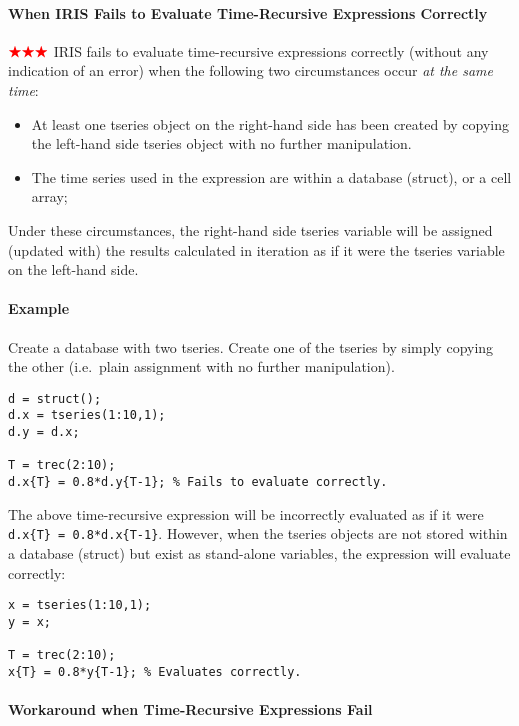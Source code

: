\paragraph{When IRIS Fails to Evaluate Time-Recursive Expressions
Correctly}

${\color{red}\bigstar\bigstar\bigstar}$ IRIS fails to evaluate time-recursive expressions correctly
(without any indication of an error) when the following two
circumstances occur \emph{at the same time}:

\begin{itemize}
\item
  At least one tseries object on the right-hand side has been created by
  copying the left-hand side tseries object with no further
  manipulation.
\item
  The time series used in the expression are within a database (struct),
  or a cell array;
\end{itemize}

Under these circumstances, the right-hand side tseries variable will be
assigned (updated with) the results calculated in iteration as if it
were the tseries variable on the left-hand side.

\paragraph{Example}

Create a database with two tseries. Create one of the tseries by simply
copying the other (i.e.~plain assignment with no further manipulation).

\begin{verbatim}
d = struct();
d.x = tseries(1:10,1);
d.y = d.x;

T = trec(2:10);
d.x{T} = 0.8*d.y{T-1}; % Fails to evaluate correctly.
\end{verbatim}

The above time-recursive expression will be incorrectly evaluated as if
it were \texttt{d.x\{T\} = 0.8*d.x\{T-1\}}. However, when the tseries
objects are not stored within a database (struct) but exist as
stand-alone variables, the expression will evaluate correctly:

\begin{verbatim}
x = tseries(1:10,1);
y = x;

T = trec(2:10);
x{T} = 0.8*y{T-1}; % Evaluates correctly.
\end{verbatim}

\paragraph{Workaround when Time-Recursive Expressions
Fail}

